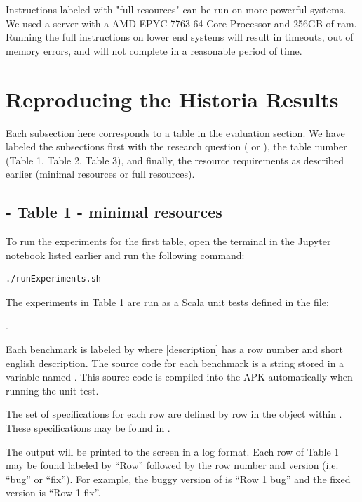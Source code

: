 \documentclass{acmart} %
\begin{document}
Instructions labeled with "full resources" can be run on more powerful systems.  We used a server with a AMD EPYC 7763 64-Core Processor and 256GB of ram.  Running the full instructions on lower end systems will result in timeouts, out of memory errors, and will not complete in a reasonable period of time.


\section{Reproducing the Historia Results}

Each subsection here corresponds to a table in the evaluation section.  We have labeled the subsections first with the research question ( or ), the table number (Table 1, Table 2, Table 3), and finally, the resource requirements as described earlier (minimal resources or full resources).

\subsection{ - Table 1 - minimal resources}

To run the experiments for the first table, open the terminal in the Jupyter notebook listed earlier and run the following command:
\begin{lstlisting}[language=bash]
    ./runExperiments.sh
\end{lstlisting}

The experiments in Table 1 are run as a Scala unit tests defined in the file: 

.  

Each benchmark is labeled by  where [description] has a row number and short english description.
The source code for each benchmark is a string stored in a variable named .
This source code is compiled into the APK automatically when running the unit test.

The set of \newls specifications for each row are defined by row in the  object within .  These specifications may be found in .

The output will be printed to the screen in a log format.  Each row of Table 1 may be found labeled by ``Row'' followed by the row number and version (i.e. ``bug'' or ``fix'').  For example, the buggy version of \apGa is ``Row 1 bug'' and the fixed version is ``Row 1 fix''.  
\end{document}
